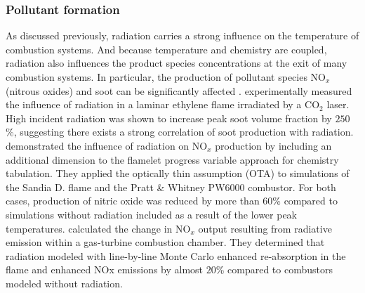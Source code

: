 \subsubsection{Pollutant formation}
As discussed previously, radiation carries a strong influence on the temperature of combustion systems. 
And because temperature and chemistry are coupled, radiation also influences the product species concentrations at the exit of many combustion systems. In particular, the production of pollutant species NO$_x$ (nitrous oxides) and soot can be significantly affected \cite{Viskanta2010RadiativeSystems}.
\citet{Medwell2011TheRadiation} experimentally measured the influence of radiation in a laminar ethylene flame irradiated by a CO$_2$ laser. High incident radiation was shown to increase peak soot volume fraction by $250$\%, suggesting there exists a strong correlation of soot production with radiation.
\citet{Ihme2008ModelingFormulation} demonstrated the influence of radiation on NO$_x$ production by including an additional dimension to the flamelet progress variable approach for chemistry tabulation.
They applied the optically thin assumption (OTA) to simulations of the Sandia D. flame and the Pratt \& Whitney PW6000 combustor.
For both cases, production of nitric oxide was reduced by more than $60$\% compared to simulations without radiation included as a result of the lower peak temperatures. \citet{Ren2017MonteChamber} calculated the change in NO$_x$ output resulting from radiative emission within a gas-turbine combustion chamber. They determined that radiation modeled with line-by-line Monte Carlo enhanced re-absorption in the flame and enhanced NOx emissions by almost $20$\% compared to combustors modeled without radiation.

